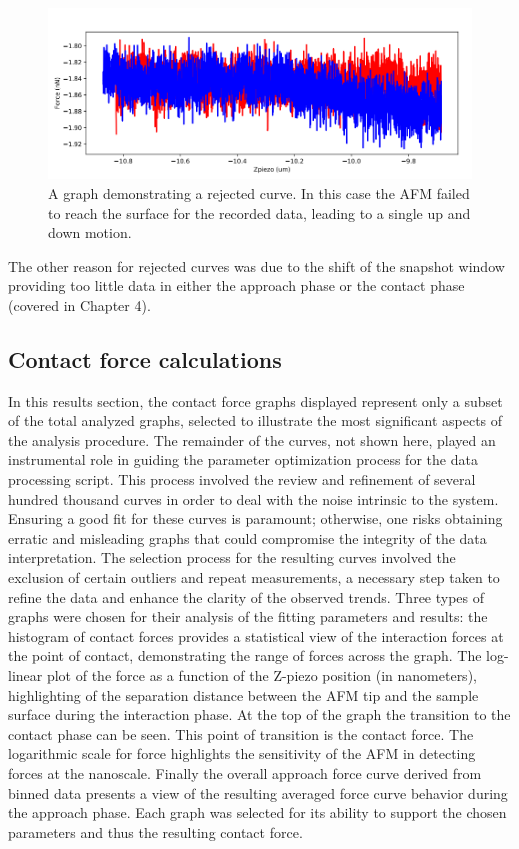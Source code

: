 \begin{figure}
    \centering
    \includegraphics[width=0.75\linewidth]{chapter5/miss_error.png}
    \caption{A graph demonstrating a rejected curve. In this case the AFM failed to reach the surface for the recorded data, leading to a single up and down motion.}
    \label{fig:miss-error}
\end{figure}

The other reason for rejected curves was due to the shift of the snapshot window providing too little data in either the approach phase or the contact phase (covered in Chapter 4). 

\subsection{Contact force calculations}

In this results section, the contact force graphs displayed represent only a subset of the total analyzed graphs, selected to illustrate the most significant aspects of the analysis procedure. The remainder of the curves, not shown here, played an instrumental role in guiding the parameter optimization process for the data processing script. This process involved the review and refinement of several hundred thousand curves in order to deal with the noise intrinsic to the system. Ensuring a good fit for these curves is paramount; otherwise, one risks obtaining erratic and misleading graphs that could compromise the integrity of the data interpretation. The selection process for the resulting curves involved the exclusion of certain outliers and repeat measurements, a necessary step taken to refine the data and enhance the clarity of the observed trends. Three types of graphs were chosen for their analysis of the fitting parameters and results: the histogram of contact forces provides a statistical view of the interaction forces at the point of contact, demonstrating the range of forces across the graph. The log-linear plot of the force as a function of the Z-piezo position (in nanometers), highlighting of the separation distance between the AFM tip and the sample surface during the interaction phase. At the top of the graph the transition to the contact phase can be seen. This point of transition is the contact force. The logarithmic scale for force highlights the sensitivity of the AFM in detecting forces at the nanoscale. Finally the overall approach force curve derived from binned data presents a view of the resulting averaged force curve behavior during the approach phase. Each graph was selected for its ability to support the chosen parameters and thus the resulting contact force.


